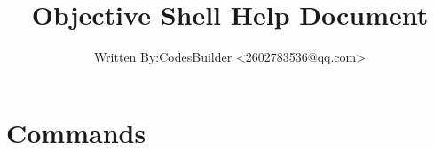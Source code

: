 \documentclass[UTF8]{document}
\title{Objective Shell Help Document}
\author{Written By:CodesBuilder <2602783536@qq.com>}
\begin{document}
    \maketitle
    \section{Commands}
\end{document}
